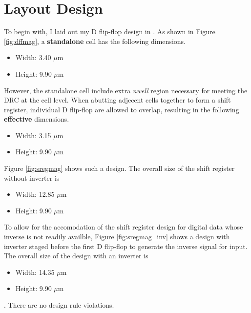 \documentclass[11pt]{article}
\begin{document}
\section{Layout Design}
    To begin with, I laid out my D flip-flop design in . As shown in Figure \ref{fig:dffmag}, a \textbf{standalone} cell has the following dimensions.
    \begin{itemize}
        \item Width: 3.40 $\mu$m
        \item Height: 9.90 $\mu$m
    \end{itemize} 
    However, the standalone cell include extra \textit{nwell} region necessary for meeting the DRC at the cell level. When abutting adjecent cells together to form a shift register, individual D flip-flop are allowed to overlap, resulting in the following \textbf{effective} dimensions.
    \begin{itemize}
        \item Width: 3.15 $\mu$m
        \item Height: 9.90 $\mu$m
    \end{itemize} 
    Figure \ref{fig:sregmag} shows such a design. The overall size of the shift register without inverter is 
    \begin{itemize}
        \item Width: 12.85 $\mu$m
        \item Height: 9.90 $\mu$m
    \end{itemize}
    To allow for the accomodation of the shift register design for digital data whose inverse is not readily availble, Figure \ref{fig:sregmag_inv} shows a design with inverter staged before the first D flip-flop to generate the inverse signal for input. The overall size of the design with an inverter is 
    \begin{itemize}
        \item Width: 14.35 $\mu$m
        \item Height: 9.90 $\mu$m 
    \end{itemize}.
    There are no design rule violations.
\end{document}
